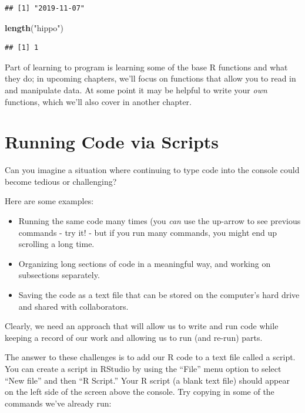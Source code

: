 \documentclass[]{Nemilov}
\newenvironment{Shaded}{\begin{snugshade}}{\end{snugshade}}
\newcommand{\KeywordTok}[1]{\textcolor[rgb]{0.13,0.29,0.53}{\textbf{#1}}}
\newcommand{\NormalTok}[1]{#1}
\newcommand{\StringTok}[1]{\textcolor[rgb]{0.31,0.60,0.02}{#1}}
\providecommand{\tightlist}{%
  \setlength{\itemsep}{0pt}\setlength{\parskip}{0pt}}
\begin{document}
\begin{verbatim}
## [1] "2019-11-07"
\end{verbatim}

\begin{Shaded}
\begin{Highlighting}[]
\KeywordTok{length}\NormalTok{(}\StringTok{"hippo"}\NormalTok{)}
\end{Highlighting}
\end{Shaded}

\begin{verbatim}
## [1] 1
\end{verbatim}

Part of learning to program is learning some of the base R functions and
what they do; in upcoming chapters, we'll focus on functions that allow you to
read in and manipulate data. At some point it may be helpful to write your
\emph{own} functions, which we'll also cover in another chapter.

\hypertarget{r-getting-started-script}{%
\section{Running Code via Scripts}\label{r-getting-started-script}}

Can you imagine a situation where continuing to type code into the console
could become tedious or challenging?

Here are some examples:

\begin{itemize}
\tightlist
\item
  Running the same code many times (you
  \emph{can} use the up-arrow to see previous commands - try it! - but if you
  run many commands, you might end up scrolling a long time.
\item
  Organizing long sections of code in a meaningful way, and working on
  subsections separately.
\item
  Saving the code as a text file that can be stored on the computer's
  hard drive and shared with collaborators.
\end{itemize}

Clearly, we need an approach that will allow us to write and run code
while keeping a record of our work and allowing us to run (and re-run) parts.

The answer to these challenges is to
add our R code to a text file called a script.
You can create a script in RStudio by using the ``File''
menu option to select ``New file'' and then ``R Script.''
Your R script (a blank text file) should appear on the left side of the screen
above the console.
Try copying in some
of the commands we've already run:
\end{document}
